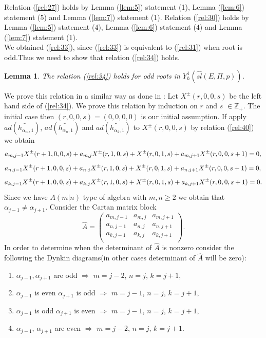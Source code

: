 \documentclass[english]{elsarticle}
\newtheorem{lemma}{Lemma}[section]
\numberwithin{equation}{section}
\begin{document}
Relation (\ref{rel:27}) holds by Lemma (\ref{lem:5}) statement (1), Lemma (\ref{lem:6}) statement (5) and Lemma (\ref{lem:7}) statement (1). Relation (\ref{rel:30}) holds by Lemma (\ref{lem:5}) statement (4), Lemma (\ref{lem:6}) statement (4) and Lemma (\ref{lem:7}) statement (1).\\
We obtained (\ref{rel:33}), since (\ref{rel:33}) is equivalent to (\ref{rel:31}) when root is odd.Thus we need to show that relation (\ref{rel:34}) holds.

\begin{lemma}
\label{lem:8}
The relation (\ref{rel:34}) holds for odd roots in $Y_{\hbar}^1(\hat{sl}(E,\Pi,p))$.\\
\end{lemma}

We prove this relation in a similar way as done in \cite{Mazurenko}:
Let $X^{\pm}(r,0,0,s)$ be the left hand side of (\ref{rel:34}). We prove this relation by induction on $r$ and $s$ $\in \mathbb{Z}_{+}$. The initial case then $(r,0,0,s)=(0,0,0,0)$ is our initial assumption. If apply $ad(\tilde{h_{\alpha_{m},1}})$, $ad(\tilde{h_{\alpha_{n},1}})$ and $ad(\tilde{h_{\alpha_{k},1}})$ to $X^{\pm}(r,0,0,s)$ by relation (\ref{rel:40}) we obtain
\[
 a_{m,j-1}X^{\pm}(r+1,0,0,s)+a_{m,j}X^{\pm}(r,1,0,s)+X^{\pm}(r,0,1,s)+a_{m,j+1}X^{\pm}(r,0,0,s+1)=0,\\
\]
\[
 a_{n,j-1}X^{\pm}(r+1,0,0,s)+a_{n,j}X^{\pm}(r,1,0,s)+X^{\pm}(r,0,1,s)+a_{n,j+1}X^{\pm}(r,0,0,s+1)=0,\\
\]
\[
 a_{k,j-1}X^{\pm}(r+1,0,0,s)+a_{k,j}X^{\pm}(r,1,0,s)+X^{\pm}(r,0,1,s)+a_{k,j+1}X^{\pm}(r,0,0,s+1)=0.\\
\]
Since we have $A(m|n)$ type of algebra with $m,n\geq 2$ we obtain that $\alpha_{j-1}\neq \alpha_{j+1}$.
Consider the Cartan matrix block
\[
\hat{A}=
\begin{pmatrix}
  a_{m,j-1} & a_{m,j} & a_{m,j+1}\\
  a_{n,j-1} & a_{n,j} & a_{n,j+1}\\
  a_{k,j-1} & a_{k,j} & a_{k,j+1}\\
\end{pmatrix}.
\]
In order to determine when the determinant of $\hat{A}$ is nonzero consider the following the Dynkin diagrams(in other cases determinant of $\hat{A}$ will be zero):
\begin{enumerate}
    \item $\alpha_{j-1},\alpha_{j+1}$ are odd $\Rightarrow$ $m=j-2$, $n=j$, $k=j+1$,
    \item $\alpha_{j-1}$ is even $\alpha_{j+1}$ is odd $\Rightarrow$ $m=j-1$, $n=j$, $k=j+1$,
    \item $\alpha_{j-1}$ is odd $\alpha_{j+1}$ is even $\Rightarrow$ $m=j-1$, $n=j$, $k=j+1$,
    \item $\alpha_{j-1}$, $\alpha_{j+1}$ are even $\Rightarrow$ $m=j-2$, $n=j$, $k=j+1$.
\end{enumerate}
\end{document}
